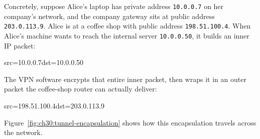 Concretely, suppose Alice's laptop has private address \texttt{10.0.0.7} on her company's network, and the company gateway sits at public address \texttt{203.0.113.9}. Alice is at a coffee shop with public address \texttt{198.51.100.4}. When Alice's machine wants to reach the internal server \texttt{10.0.0.50}, it builds an inner IP packet:

\begin{center}
\ttfamily src=10.0.0.7\quad dst=10.0.0.50
\end{center}

The VPN software encrypts that entire inner packet, then wraps it in an outer packet the coffee-shop router can actually deliver:

\begin{center}
\ttfamily src=198.51.100.4\quad dst=203.0.113.9
\end{center}

Figure~\ref{fig:ch30:tunnel-encapsulation} shows how this encapsulation travels across the network.


